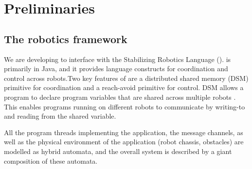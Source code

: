 \section{Preliminaries}
\label{sect:Prelim}



\subsection{The \StarL robotics framework}
We are developing \rolang to interface with the Stabilizing Robotics Language (\StarL). 
\StarL is primarily in Java, and it provides language constructs for coordination and control
across robots.Two key features of \StarL are a distributed shared memory (DSM) primitive
for coordination and a reach-avoid primitive for control. DSM allows a
program to declare program variables that are shared across multiple robots
. This enables programs running on different
robots to communicate by writing-to and reading from the shared variable.

All the program threads implementing the application, the message channels,
as well as the physical environment of the application (robot chassis, obstacles)
are modelled as hybrid automata, and the overall system is described
by a giant composition of these automata. 